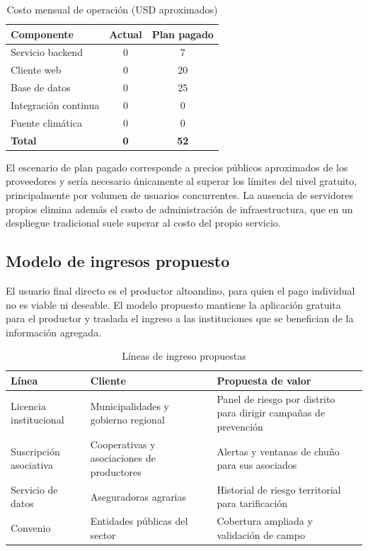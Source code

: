 \documentclass[conference]{IEEEtran}
\begin{document}
\begin{table}[htbp]
\caption{Costo mensual de operaci\'on (USD aproximados)}
\begin{center}
\begin{tabular}{@{}lcc@{}}
\toprule
\textbf{Componente} & \textbf{Actual} & \textbf{Plan pagado} \\
\midrule
Servicio backend & 0 & 7 \\
Cliente web & 0 & 20 \\
Base de datos & 0 & 25 \\
Integraci\'on continua & 0 & 0 \\
Fuente clim\'atica & 0 & 0 \\
\midrule
\textbf{Total} & \textbf{0} & \textbf{52} \\
\bottomrule
\end{tabular}
\label{tab:costos}
\end{center}
\end{table}

El escenario de plan pagado corresponde a precios p\'ublicos aproximados de los
proveedores y ser\'ia necesario \'unicamente al superar los l\'imites del nivel
gratuito, principalmente por volumen de usuarios concurrentes. La ausencia de
servidores propios elimina adem\'as el costo de administraci\'on de
infraestructura, que en un despliegue tradicional suele superar al costo del
propio servicio.

\subsection{Modelo de ingresos propuesto}

El usuario final directo es el productor altoandino, para quien el pago
individual no es viable ni deseable. El modelo propuesto mantiene la aplicaci\'on
gratuita para el productor y traslada el ingreso a las instituciones que se
benefician de la informaci\'on agregada.

\begin{table}[htbp]
\caption{L\'ineas de ingreso propuestas}
\begin{center}
\begin{tabular}{@{}p{2.1cm}p{2.6cm}p{2.4cm}@{}}
\toprule
\textbf{L\'inea} & \textbf{Cliente} & \textbf{Propuesta de valor} \\
\midrule
Licencia institucional &
Municipalidades y gobierno regional &
Panel de riesgo por distrito para dirigir campa\~nas de prevenci\'on \\
\addlinespace
Suscripci\'on asociativa &
Cooperativas y asociaciones de productores &
Alertas y ventanas de chu\~no para sus asociados \\
\addlinespace
Servicio de datos &
Aseguradoras agrarias &
Historial de riesgo territorial para tarificaci\'on \\
\addlinespace
Convenio &
Entidades p\'ublicas del sector &
Cobertura ampliada y validaci\'on de campo \\
\bottomrule
\end{tabular}
\label{tab:ingresos}
\end{center}
\end{table}
\end{document}
